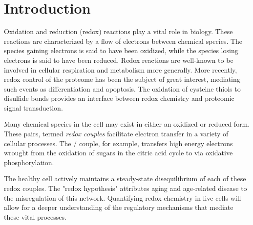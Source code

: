 
\chapter{Introduction} %

\label{Chapter1} %


Oxidation and reduction (redox) reactions play a vital role in biology. These reactions are characterized by a flow of electrons between chemical species. The species gaining electrons is said to have been oxidized, while the species losing electrons is said to have been reduced. Redox reactions are well-known to be involved in cellular respiration and metabolism more generally. More recently, redox control of the proteome has been the subject of great interest, mediating such events as differentiation and apoptosis. The oxidation of cysteine thiols to disulfide bonds provides an interface between redox chemistry and proteomic signal transduction.

Many chemical species in the cell may exist in either an oxidized or reduced form. These pairs, termed \textit{redox couples} facilitate electron transfer in a variety of cellular processes. The / couple, for example, transfers high energy electrons wrought from the oxidation of sugars in the citric acid cycle to  via oxidative phosphorylation.


The healthy cell actively maintains a steady-state disequilibrium of each of these redox couples. The "redox hypothesis" attributes aging and age-related disease to the misregulation of this network. Quantifying redox chemistry in live cells will allow for a deeper understanding of the regulatory mechanisms that mediate these vital processes.

